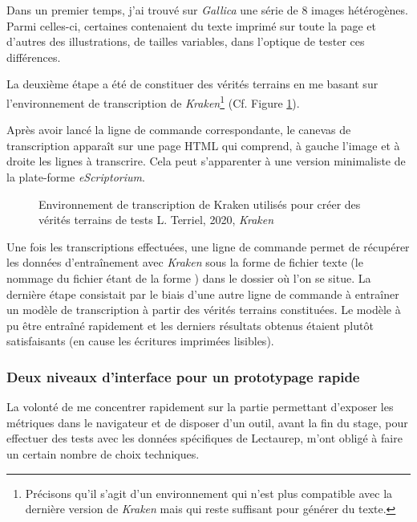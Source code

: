 Dans un premier temps, j'ai trouvé sur \textit{Gallica} une série de 8 images hétérogènes. Parmi celles-ci, certaines contenaient du texte imprimé sur toute la page et d'autres des illustrations, de tailles variables, dans l'optique de tester ces différences. 

La deuxième étape a été de constituer des vérités terrains en me basant sur l'environnement de transcription de \textit{Kraken}\footnote{Précisons qu'il s'agit d'un environnement  qui n'est plus compatible avec la dernière version de \textit{Kraken} mais qui reste suffisant pour générer du texte.} (Cf. Figure \ref{fig:transcrire_kraken}). 

Après avoir lancé la ligne de commande correspondante, le canevas de transcription apparaît sur une page HTML qui comprend, à gauche l'image et à droite les lignes à transcrire. Cela peut s'apparenter à une version minimaliste de la plate-forme \textit{eScriptorium}.   

\begin{figure}[H]
    \centering
    \centerline{}
    \caption{Environnement de transcription de Kraken utilisés pour créer des vérités terrains de tests \textcopyright L. Terriel, 2020, \textit{Kraken}}
    \label{fig:transcrire_kraken}
\end{figure}

Une fois les transcriptions effectuées, une ligne de commande permet de récupérer les données d'entraînement avec \textit{Kraken} sous la forme de fichier texte (le nommage du fichier étant de la forme ) dans le dossier où l'on se situe. La dernière étape consistait par le biais d'une autre ligne de commande à entraîner un modèle de transcription à partir des vérités terrains constituées. Le modèle à pu être entraîné rapidement et les derniers résultats obtenus étaient plutôt satisfaisants (en cause les écritures imprimées lisibles). 

\subsubsection{Deux niveaux d'interface pour un prototypage rapide}

La volonté de me concentrer rapidement sur la partie permettant d'exposer les métriques dans le navigateur et de disposer d'un outil, avant la fin du stage, pour effectuer des tests avec les données spécifiques de Lectaurep, m'ont obligé à faire un certain nombre de choix techniques. 

